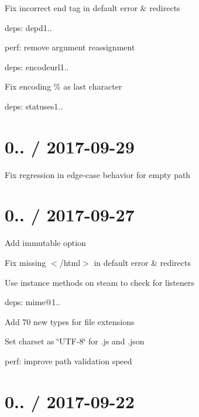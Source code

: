 
\begin{DoxyItemize}
\item Fix incorrect end tag in default error \& redirects
\item deps\+: depd1..
\begin{DoxyItemize}
\item perf\+: remove argument reassignment
\end{DoxyItemize}
\item deps\+: encodeurl1..
\begin{DoxyItemize}
\item Fix encoding {\ttfamily \%} as last character
\end{DoxyItemize}
\item deps\+: statuses1..
\end{DoxyItemize}

\section*{0.. / 2017-\/09-\/29 }


\begin{DoxyItemize}
\item Fix regression in edge-\/case behavior for empty {\ttfamily path}
\end{DoxyItemize}

\section*{0.. / 2017-\/09-\/27 }


\begin{DoxyItemize}
\item Add {\ttfamily immutable} option
\item Fix missing {\ttfamily $<$/html$>$} in default error \& redirects
\item Use instance methods on steam to check for listeners
\item deps\+: mime@1..
\begin{DoxyItemize}
\item Add 70 new types for file extensions
\item Set charset as \char`\"{}\+U\+T\+F-\/8\char`\"{} for .js and .json
\end{DoxyItemize}
\item perf\+: improve path validation speed
\end{DoxyItemize}

\section*{0.. / 2017-\/09-\/22 }


